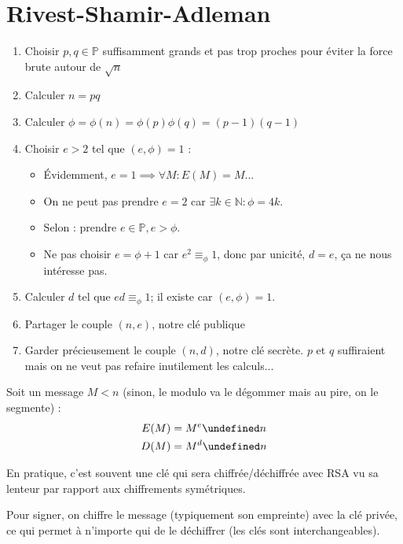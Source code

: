 \documentclass[11pt,twocolumn]{article}
\let\mod\undefined
\DeclareMathOperator{\mod}{mod}
\theoremstyle{plain}
\newcommand{\esP}{\mathbb{P}} %
\newcommand{\esN}{\mathbb{N}} %
\begin{document}
\section{Rivest-Shamir-Adleman}
\begin{enumerate}
	\item Choisir $p, q \in \esP$ suffisamment grands et pas trop proches
		pour éviter la force brute autour de $\sqrt n$
	\item Calculer $n=pq$
	\item Calculer $\phi=\phi(n)=\phi(p)\phi(q)=
		\left(p-1\right)\left(q-1\right)$
	\item Choisir $e>2$ tel que $\left(e,\phi\right)=1$ :
		\begin{itemize}
			\item Évidemment, $e=1 \implies \forall M : E(M)=M$...
			\item On ne peut pas prendre $e=2$ car $\exists k\in\esN : \phi=4k$.
			\item Selon \cite{Buys} : prendre $e \in \esP, e>\phi$.
			\item Ne pas choisir $e=\phi+1$ car $e^2 \equiv_\phi 1$,
				donc par unicité, $d=e$, ça ne nous intéresse pas.
		\end{itemize}
	\item Calculer $d$ tel que $ed \equiv_\phi 1$;
		il existe car $\left(e,\phi\right)=1$.
	\item Partager le couple $(n,e)$, notre clé publique
	\item Garder précieusement le couple $(n,d)$, notre clé secrète.
		$p$ et $q$ suffiraient mais
		on ne veut pas refaire inutilement les calculs...
\end{enumerate}

Soit un message $M < n$
(sinon, le modulo va le dégommer mais au pire, on le segmente) :
\begin{align*}
	E(M) &= M^e \mod n \\
	D(M) &= M^d \mod n
\end{align*}

En pratique, c'est souvent une clé qui sera chiffrée/déchiffrée avec
RSA vu sa lenteur par rapport aux chiffrements symétriques.

Pour signer, on chiffre le message (typiquement son empreinte)
avec la clé privée, ce qui permet à n'importe qui de le déchiffrer
(les clés sont interchangeables).
\end{document}
